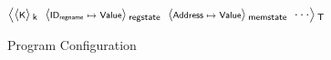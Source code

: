 \begin{figure}
  \centering
  \renewcommand{\dotCt}[1]{\scriptstyle\s{#1}}
  \newcommand{\regstate}{\scriptstyle\s{ID}_\s{regname} \;\mapsto\; \s{Value}}
  \newcommand{\argc}{\scriptstyle\s{Int}}
  \newcommand{\argv}{\scriptstyle\s{Address}} 
  \newcommand{\entrypoint}{\scriptstyle\s{Address}}
  \newcommand{\codemem}{\scriptstyle\textit{Address} \;\mapsto\; \textit{Instruction}}
  \newcommand{\datamem}{\scriptstyle\s{Address} \;\mapsto\; \s{Value}}
  \newcommand{\bssmem}{\scriptstyle\textit{Address} \;\mapsto\; \textit{Value}}
  \newcommand{\stackmem}{\scriptstyle\textit{Address} \;\mapsto\; \textit{Value}}
  \newcommand{\heapmem}{\scriptstyle\textit{Address} \;\mapsto\; \textit{Value}}
$
\kall{T}{
  \begin{array}{@{}c@{}}
  \kall{k}{\dotCt{K}} \mathrel{}
  \mathrel{}
  \kall{regstate}{\regstate} \mathrel{}
  \mathrel{}
  \kall{memstate} {\datamem} \mathrel{}
  \mathrel{}
  \cdots
  \cmt{ 
  \kall{executionEnv}{ 
  \kall{commandineArgs}{
    \kall{argc}{\argc} \mathrel{}    
    \kall{argv}{\argv} \mathrel{}
  } \mathrel{}
  \kall{entryPoint}{\entrypoint} \mathrel{}
}}
  \end{array}
}
$
  \caption{Program Configuration}
  \label{fig:config}
\end{figure}
